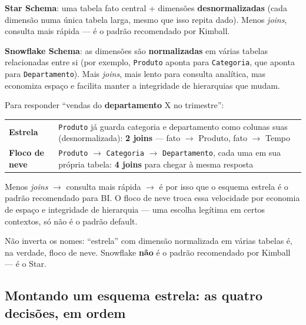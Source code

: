 \begin{conceito}
\textbf{Star Schema}: uma tabela fato central + dimensões
\textbf{desnormalizadas} (cada dimensão numa única tabela larga, mesmo que
isso repita dado). Menos \textit{joins}, consulta mais rápida --- é o
padrão recomendado por Kimball.

\textbf{Snowflake Schema}: as dimensões são \textbf{normalizadas} em
várias tabelas relacionadas entre si (por exemplo, \texttt{Produto}
aponta para \texttt{Categoria}, que aponta para \texttt{Departamento}).
Mais \textit{joins}, mais lento para consulta analítica, mas economiza
espaço e facilita manter a integridade de hierarquias que mudam.
\end{conceito}

\begin{exemplo}
Para responder “vendas do \textbf{departamento} X no trimestre”:

\begin{center}
\begin{tabular}{@{}p{2.5cm}p{9.2cm}@{}}
\toprule
\textbf{Estrela} & \texttt{Produto} já guarda categoria e departamento
como colunas suas (desnormalizada): \textbf{2 joins} --- fato $\to$
Produto, fato $\to$ Tempo \\
\textbf{Floco de neve} & \texttt{Produto} $\to$ \texttt{Categoria} $\to$
\texttt{Departamento}, cada uma em sua própria tabela: \textbf{4 joins}
para chegar à mesma resposta \\
\bottomrule
\end{tabular}
\end{center}

Menos \textit{joins} $\to$ consulta mais rápida $\to$ é por isso que o
esquema estrela é o padrão recomendado para BI. O floco de neve troca essa
velocidade por economia de espaço e integridade de hierarquia --- uma
escolha legítima em certos contextos, só não é o padrão default.
\end{exemplo}

\begin{cuidado}
Não inverta os nomes: “estrela” com dimensão normalizada em várias
tabelas é, na verdade, floco de neve. Snowflake \textbf{não} é o padrão
recomendado por Kimball --- é o Star.
\end{cuidado}

\subsection{Montando um esquema estrela: as quatro decisões, em ordem}

